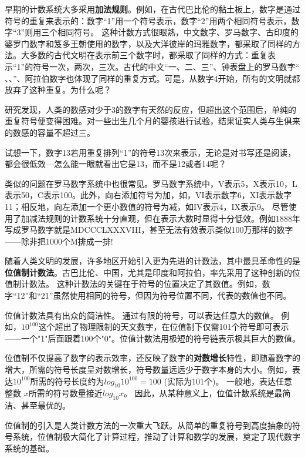 早期的计数系统大多采用{\bf 加法规则}。例如，在古代巴比伦的黏土板上，数字是通过符号的重复来表示的：数字“1”用一个符号表示，数字“2”用两个相同符号表示，数字“3”则用三个相同符号。
这种计数方式很眼熟，中文数字、罗马数字、古印度的婆罗门数字和笈多王朝使用的数字，以及大洋彼岸的玛雅数字，都采取了同样的方法。大多数的古代文明在表示前三个数字时，都采取了同样的方式：重复表示“1”的符号一次，两次，三次。古代的中文“一、二、三”、钟表盘上的罗马数字“\uppercase\expandafter{} 、\uppercase\expandafter{}、\uppercase\expandafter{}”、阿拉伯数字也体现了同样的重复方式。可是，从数字4开始，所有的文明就都放弃了这种重复。为什么呢？

研究发现，人类的数感对少于3的数字有天然的反应，但超出这个范围后，单纯的重复符号便变得困难。对一些出生几个月的婴孩进行试验，结果证实人类与生俱来的数感的容量不超过三。

试想一下，数字13若用重复排列“1”的符号13次来表示，无论是对书写还是阅读，都会很低效---怎么能一眼就看出它是13，而不是12或者14呢？

类似的问题在罗马数字系统中也很常见。罗马数字系统中，V表示5，X表示10，L表示50，C表示100。此外，向右添加符号为加，如，VI表示数字6，XI表示数字11；相反地，向左添加一个更小数值的符号为减，如IV表示4，IX表示9。
尽管使用了加减法规则的计数系统十分直观，但在表示大数时显得十分低效。例如1888年写成罗马数字就是MDCCCLXXXVIII，甚至无法有效表示类似100万那样的数字——除非把1000个M排成一排!

随着人类文明的发展，许多地区开始引入更为先进的计数法，其中最具革命性的是{\bf 位值制计数法}。古巴比伦、中国，尤其是印度和阿拉伯，率先采用了这种创新的位值制计数法。
这种计数法的关键在于符号的位置决定了其数值。例如，数字“12”和“21”虽然使用相同的符号，但因为符号位置不同，代表的数值也不同。

位值计数法具有出众的简洁性。
通过有限的符号，可以表达任意大的数值。
例如，$10^{100}$这个超出了物理限制的天文数字，在位值制下仅需101个符号即可表示——一个"1"后面跟着100个"0"。位值计数法用极短的符号链表示极其巨大的数值。

位值制不仅提高了数字的表示效率，还反映了数字的{\bf 对数增长}特性，即随着数字的增大，所需的符号长度呈对数增长，符号数量远远少于数字本身的大小。例如，表达$10^{100}$所需的符号长度约为$log_10 10^{100}=100$ (实际为101个)。
一般地，表达任意整数 $x$所需的符号数量接近$log_{10} x$。
因此，从某种意义上，位值计数系统是最简洁、甚至最优的。

位值制的引入是人类计数方法的一次重大飞跃。从简单的重复符号到高度抽象的符号系统，位值制极大简化了计算过程，推动了计算和数学的发展，奠定了现代数字系统的基础。

